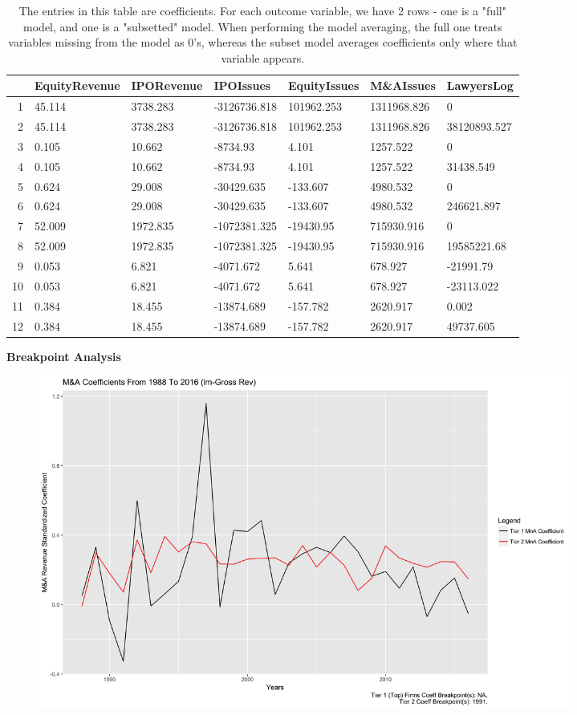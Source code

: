 \documentclass{article}
\begin{document}
\begin{table}[H]
\centering
\begin{tabular}{rllllll}
  \hline
 & EquityRevenue & IPORevenue & IPOIssues & EquityIssues & M\&AIssues & LawyersLog \\ 
  \hline
1 & 45.114 & 3738.283 & -3126736.818 & 101962.253 & 1311968.826 & 0 \\ 
  2 & 45.114 & 3738.283 & -3126736.818 & 101962.253 & 1311968.826 & 38120893.527 \\ 
  3 & 0.105 & 10.662 & -8734.93 & 4.101 & 1257.522 & 0 \\ 
  4 & 0.105 & 10.662 & -8734.93 & 4.101 & 1257.522 & 31438.549 \\ 
  5 & 0.624 & 29.008 & -30429.635 & -133.607 & 4980.532 & 0 \\ 
  6 & 0.624 & 29.008 & -30429.635 & -133.607 & 4980.532 & 246621.897 \\ 
  7 & 52.009 & 1972.835 & -1072381.325 & -19430.95 & 715930.916 & 0 \\ 
  8 & 52.009 & 1972.835 & -1072381.325 & -19430.95 & 715930.916 & 19585221.68 \\ 
  9 & 0.053 & 6.821 & -4071.672 & 5.641 & 678.927 & -21991.79 \\ 
  10 & 0.053 & 6.821 & -4071.672 & 5.641 & 678.927 & -23113.022 \\ 
  11 & 0.384 & 18.455 & -13874.689 & -157.782 & 2620.917 & 0.002 \\ 
  12 & 0.384 & 18.455 & -13874.689 & -157.782 & 2620.917 & 49737.605 \\ 
   \hline
\end{tabular}
\caption{The entries in this table are coefficients. For each outcome variable, 
                  we have 2 rows - one is a "full" model, and one is a "subsetted" model.
                  When performing the model averaging, the full one treats variables missing from the model as 0's,
                  whereas the subset model averages coefficients only where that variable appears.} 
\end{table}

\newpage
{\large \textbf{Breakpoint Analysis} }
\begin{figure}[H]\centering
\includegraphics[width=0.85\textwidth]{../IndivTexOutput/Breakpoints-1988-2016-lm-GrossRev-2.jpg}\end{figure}
\end{document}
